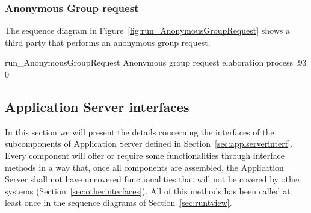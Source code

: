 \documentclass[../DD0.tex]{subfiles}
\begin{document}
    \clearpage
    \subsubsection{Anonymous Group request}
    \label{sec:anonymousgroup}

      The sequence diagram in Figure~\ref{fig:run_AnonymousGroupRequest} shows a third party that performs an anonymous group request.

      \fetchUML
        {run_AnonymousGroupRequest}
        {Anonymous group request elaboration process}
        {.93}           %
        {0}           %

  \clearpage
  \subsection{Application Server interfaces}
  \label{sec:compinterf}

    In this section we will present the details concerning the interfaces of the subcomponents of Application Server defined in Section~\ref{sec:applserverinterf}. Every component will offer or require some functionalities through interface methods in a way that, once all components are assembled, the Application Server shall not have uncovered functionalities that will not be covered by other systems (Section~\ref{sec:otherinterfaces}). All of this methods has been called at least once in the sequence diagrams of Section~\ref{sec:runtview}.

    \subsubsection{\AccountManager}
\end{document}
